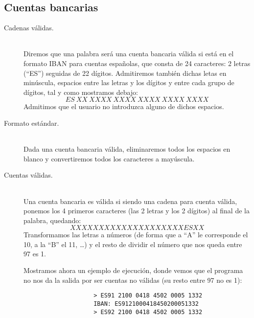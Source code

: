 \documentclass[12pt]{article}
\begin{document}
    \subsection{Cuentas bancarias}
    \begin{description}
        \item [Cadenas válidas.]~\\
            Diremos que una palabra será una cuenta bancaria válida si está en el formato IBAN para cuentas españolas, que consta de 24 caracteres: 2 letras (``ES'') seguidas de 22 dígitos. Admitiremos también dichas letas en minúscula, espacios entre las letras y los dígitos y entre cada grupo de dígitos, tal y como mostramos debajo:
            \begin{equation*}
                ES\ XX\ XXXX\ XXXX\ XXXX\ XXXX\ XXXX
            \end{equation*}
            Admitimos que el usuario no introduzca alguno de dichos espacios.
        \item [Formato estándar.]~\\
            Dada una cuenta bancaria válida, eliminaremos todos los espacios en blanco y convertiremos todos los caracteres a mayúscula.
        \item [Cuentas válidas.]~\\
            Una cuenta bancaria es válida si siendo una cadena para cuenta válida, ponemos los 4 primeros caracteres (las 2 letras y los 2 dígitos) al final de la palabra, quedando:
            \begin{equation*}
                XXXXXXXXXXXXXXXXXXXXESXX
            \end{equation*}
            Transformamos las letras a números (de forma que a ``A'' le corresponde el 10, a la ``B'' el 11, \ldots) y el resto de dividir el número que nos queda entre 97 es 1.
            \begin{ejemplo}
                Mostramos ahora un ejemplo de ejecución, donde vemos que el programa no nos da la salida por ser cuentas no válidas (su resto entre 97 no es 1):
                \begin{verbatim}
                    > ES91 2100 0418 4502 0005 1332
                    IBAN: ES9121000418450200051332
                    > ES92 2100 0418 4502 0005 1332
                \end{verbatim}
            \end{ejemplo}
    \end{description}
\end{document}
